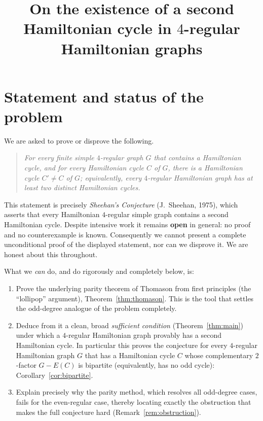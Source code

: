 \documentclass{amsart}
\theoremstyle{plain}
\theoremstyle{definition}
\begin{document}
\title{On the existence of a second Hamiltonian cycle in $4$-regular Hamiltonian graphs}
\maketitle

\section{Statement and status of the problem}

We are asked to prove or disprove the following.

\begin{quote}
\emph{For every finite simple $4$-regular graph $G$ that contains a Hamiltonian
cycle, and for every Hamiltonian cycle $C$ of $G$, there is a Hamiltonian cycle
$C'\neq C$ of $G$; equivalently, every $4$-regular Hamiltonian graph has at
least two distinct Hamiltonian cycles.}
\end{quote}

This statement is precisely \emph{Sheehan's Conjecture} (J.~Sheehan, 1975),
which asserts that every Hamiltonian $4$-regular simple graph contains a second
Hamiltonian cycle.  Despite intensive work it remains \textbf{open} in general:
no proof and no counterexample is known.  Consequently we cannot present a
complete unconditional proof of the displayed statement, nor can we disprove it.
We are honest about this throughout.

What we \emph{can} do, and do rigorously and completely below, is:
\begin{enumerate}
\item[(i)] Prove the underlying parity theorem of Thomason from first principles
(the ``lollipop'' argument), Theorem~\ref{thm:thomason}.  This is the tool that
settles the odd-degree analogue of the problem completely.
\item[(ii)] Deduce from it a clean, broad \emph{sufficient condition}
(Theorem~\ref{thm:main}) under which a $4$-regular Hamiltonian graph provably has
a second Hamiltonian cycle.  In particular this proves the conjecture for every
$4$-regular Hamiltonian graph $G$ that has a Hamiltonian cycle $C$ whose
complementary $2$-factor $G-E(C)$ is bipartite (equivalently, has no odd cycle):
Corollary~\ref{cor:bipartite}.
\item[(iii)] Explain precisely why the parity method, which resolves all
odd-degree cases, fails for the even-regular case, thereby locating exactly the
obstruction that makes the full conjecture hard
(Remark~\ref{rem:obstruction}).
\end{enumerate}
\end{document}
